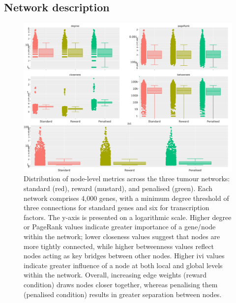 

\subsection{Network description} \label{s:N_I:tum_describe}

\begin{figure}[!t]  
\centering
\includegraphics[width=1.0\textwidth,keepaspectratio]{Sections/Network_I/Resources/Tum_network/NetworkMetricsComp_6TF.png}
    \caption[Tum: centrality network metrics]{Distribution of node-level metrics across the three tumour networks: standard (red), reward (mustard), and penalised (green). Each network comprises 4,000 genes, with a minimum degree threshold of three connections for standard genes and six for transcription factors. The y-axis is presented on a logarithmic scale. Higher degree or PageRank values indicate greater importance of a gene/node within the network; lower closeness values suggest that nodes are more tightly connected, while higher betweenness values reflect nodes acting as key bridges between other nodes. Higher \acrlong{ivi} values indicate greater influence of a node at both local and global levels within the network. Overall, increasing edge weights (reward condition) draws nodes closer together, whereas penalising them (penalised condition) results in greater separation between nodes.
    }
    \label{fig:N_I:net_metrics_tum}
\end{figure}

